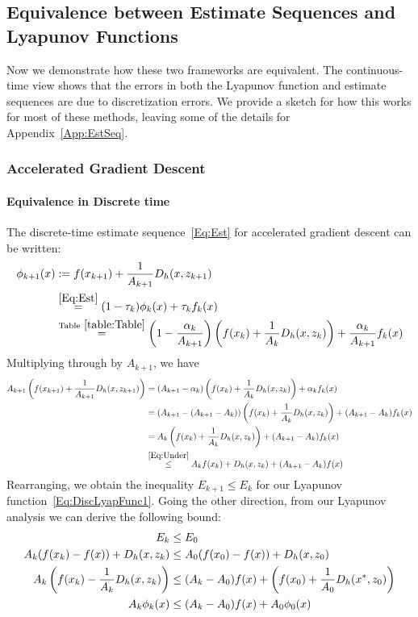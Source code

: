 \documentclass[11pt]{article}
\theoremstyle{plain}
\begin{document}
\subsection{Equivalence between Estimate Sequences and Lyapunov Functions}
Now we demonstrate how these two frameworks are equivalent.  The continuous-time view shows that the errors in both the Lyapunov function and estimate sequences are due to discretization errors. We provide a sketch for how this works for most of these methods, leaving some of the details for Appendix~\ref{App:EstSeq}.
\subsubsection{Accelerated Gradient Descent}
\paragraph{Equivalence in Discrete time}
The discrete-time estimate sequence~\eqref{Eq:Est} for accelerated gradient descent can be written:
\begin{align*}
\phi_{k+1}(x) &:= f(x_{k+1}) + \frac{1}{A_{k+1}}D_h(x, z_{k+1}) \\
& \overset{\eqref{Eq:Est}}{=} (1 - \tau_k) \phi_k(x)  + \tau_k f_k(x) \\
&\overset{\text{Table}~\ref{table:Table}}{=} \left(1 - \frac{\alpha_k}{A_{k+1}} \right)\left(f(x_k) +\frac{1}{A_k} D_h(x, z_k)\right) + \frac{\alpha_k}{A_{k+1}} f_k(x)
\end{align*}
Multiplying through by $A_{k+1}$, we have
\begin{align*}
A_{k+1} \left(f(x_{k+1}) + \frac{1}{A_{k+1}}D_h(x, z_{k+1})\right) &= (A_{k+1} - \alpha_k) \left(f(x_k) + \frac{1}{A_k}D_h(x, z_k)\right) + \alpha_k f_k(x)\\
&= (A_{k+1} - (A_{k+1} - A_k)) \left(f(x_k) + \frac{1}{A_k}D_h(x, z_k)\right) + (A_{k+1} - A_k) f_k(x)\\
&=  A_k \left(f(x_k) + \frac{1}{A_k}D_h(x, z_k) \right) + (A_{k+1} - A_k) f_k(x)\\
& \overset{\eqref{Eq:Under}}{\leq}  A_k f(x_k) + D_h(x, z_k)+ (A_{k+1} - A_k) f(x)\
\end{align*}
Rearranging, we obtain the inequality $E_{k+1} \leq E_k$ for our Lyapunov function~\eqref{Eq:DiscLyapFunc1}. 
%
%
%
Going the other direction, from our Lyapunov analysis we can derive the following bound:
\begin{subequations}\label{Eq:EstSeqErr}
\begin{align}
E_k &\leq E_0\\
A_{k}(f(x_{k}) - f(x)) + D_h(x, z_{k}) &\leq A_0 (f(x_0) - f(x)) + D_h(x, z_0) \notag\\
A_{k}\left(f(x_{k}) - \frac{1}{A_{k}}D_h(x, z_{k})\right) &\leq (A_k -  A_0) f(x) + \left(f(x_0)+ \frac{1}{A_0}  D_h(x^\ast, z_0)\right) \notag \\
A_k \phi_k(x) &\leq (A_k -A_0) f(x) + A_0 \phi_0(x) \label{Eq:EstSeq}
\end{align}
\end{subequations}
\end{document}
